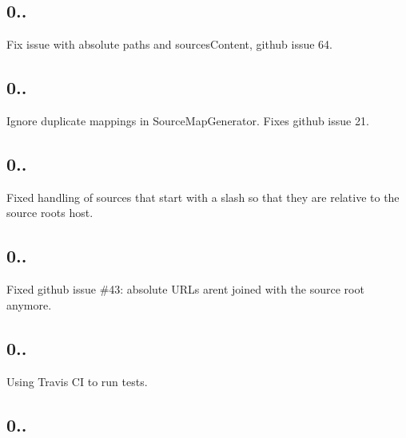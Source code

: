 \subsection*{0..}


\begin{DoxyItemize}
\item Fix issue with absolute paths and sources\+Content, github issue 64.
\end{DoxyItemize}

\subsection*{0..}


\begin{DoxyItemize}
\item Ignore duplicate mappings in Source\+Map\+Generator. Fixes github issue 21.
\end{DoxyItemize}

\subsection*{0..}


\begin{DoxyItemize}
\item Fixed handling of sources that start with a slash so that they are relative to the source root\textquotesingle{}s host.
\end{DoxyItemize}

\subsection*{0..}


\begin{DoxyItemize}
\item Fixed github issue \#43\+: absolute U\+R\+Ls aren\textquotesingle{}t joined with the source root anymore.
\end{DoxyItemize}

\subsection*{0..}


\begin{DoxyItemize}
\item Using Travis CI to run tests.
\end{DoxyItemize}

\subsection*{0..}


